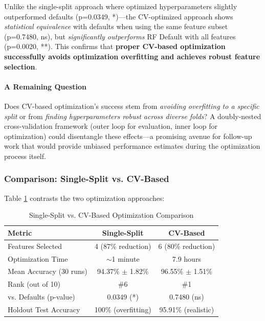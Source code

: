 \documentclass[12pt, a4paper]{article}
\begin{document}
Unlike the single-split approach where optimized hyperparameters slightly outperformed defaults (p=0.0349, *)—the CV-optimized approach shows \textit{statistical equivalence} with defaults when using the same feature subset (p=0.7480, ns), but \textit{significantly outperforms} RF Default with all features (p=0.0020, **). This confirms that \textbf{proper CV-based optimization successfully avoids optimization overfitting and achieves robust feature selection}.

\paragraph{A Remaining Question} Does CV-based optimization's success stem from \textit{avoiding overfitting to a specific split} or from \textit{finding hyperparameters robust across diverse folds}? A doubly-nested cross-validation framework (outer loop for evaluation, inner loop for optimization) could disentangle these effects—a promising avenue for follow-up work that would provide unbiased performance estimates during the optimization process itself.

\subsubsection{Comparison: Single-Split vs. CV-Based}
Table \ref{tab:comparison} contrasts the two optimization approaches:

\begin{table}[H]
    \centering
    \caption{Single-Split vs. CV-Based Optimization Comparison}
    \label{tab:comparison}
    \begin{tabular}{lcc}
        \toprule
        \textbf{Metric} & \textbf{Single-Split} & \textbf{CV-Based} \\
        \midrule
        Features Selected & 4 (87\% reduction) & 6 (80\% reduction) \\
        Optimization Time & $\sim$1 minute & 7.9 hours \\
        Mean Accuracy (30 runs) & 94.37\% $\pm$ 1.82\% & 96.55\% $\pm$ 1.51\% \\
        Rank (out of 10) & \#6 & \#1 \\
        vs. Defaults (p-value) & 0.0349 (*) & 0.7480 (ns) \\
        Holdout Test Accuracy & 100\% (overfitting) & 95.91\% (realistic) \\
        \bottomrule
    \end{tabular}
\end{table}
\end{document}
